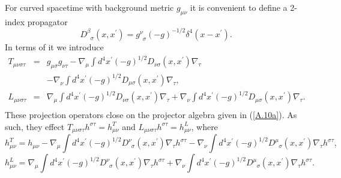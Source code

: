 For curved spacetime with background metric $g_{\mu\nu}$ it is convenient to  define a 2-index propagator
%
\begin{equation} 
[g^{\nu}_{\phantom{\nu}\beta}\nabla_{\tau}\nabla^{\tau}
+\nabla_{\beta}\nabla^{\nu}]D^{\beta}_{\phantom{\beta}\sigma}
(x,x^{\prime}) =g^{\nu}_{\phantom{\nu}\sigma}(-g)^{-1/2}\delta^4
(x-x^{\prime}).
\label{A.31a}
\end{equation}
%
In terms of it we introduce \cite{mannheim_2005}
% 
\begin{eqnarray} 
T_{\mu\nu\sigma\tau}&=&g_{\mu\sigma}g_{\nu\tau}- \nabla_{\mu}\int
d^4x^{\prime}(-g)^{1/2}
D_{\nu\sigma}(x,x^{\prime})
\nabla_{\tau}  
\nonumber\\
&&
-\nabla_{\nu}\int
d^4x^{\prime}(-g)^{1/2}
D_{\mu\sigma}(x,x^{\prime})\nabla_{\tau},
\nonumber \\
L_{\mu\nu\sigma\tau}&=&\nabla_{\mu}\int
d^4x^{\prime}(-g)^{1/2}
D_{\nu\sigma}(x,x^{\prime})
\nabla_{\tau} 
+\nabla_{\nu}\int
d^4x^{\prime}(-g)^{1/2}
D_{\mu\sigma}(x,x^{\prime})
\nabla_{\tau}.
\nonumber\\
\label{A.32a}
\end{eqnarray}
%
These projection operators close on the projector algebra given in (\ref{A.10a}). As such, they effect
$T_{\mu\nu\sigma\tau}h^{\sigma\tau}=
h^{T}_{\mu\nu}$ and $L_{\mu\nu\sigma\tau}h^{\sigma\tau}=
h^{L}_{\mu\nu}$, where
%
\begin{equation} 
h^{T}_{\mu\nu}=h_{\mu\nu}-\nabla_{\mu}\int
d^4x^{\prime}(-g)^{1/2}
D^{\nu}_{\phantom{\nu}\sigma}(x,x^{\prime})
\nabla_{\tau}h^{\sigma\tau}  
-\nabla_{\nu}\int
d^4x^{\prime}(-g)^{1/2}
D^{\mu}_{\phantom{\mu}\sigma}(x,x^{\prime})
\nabla_{\tau}h^{\sigma\tau},
\label{A.33a}
\end{equation}
% 
%
\begin{equation} 
h^{L}_{\mu\nu}=\nabla_{\mu}\int
d^4x^{\prime}(-g)^{1/2}
D^{\nu}_{\phantom{\nu}\sigma}(x,x^{\prime})
\nabla_{\tau}h^{\sigma\tau} 
+\nabla_{\nu}\int
d^4x^{\prime}(-g)^{1/2}
D^{\mu}_{\phantom{\mu}\sigma}(x,x^{\prime})
\nabla_{\tau}h^{\sigma\tau}.
\label{A.34a}
\end{equation}
% 

